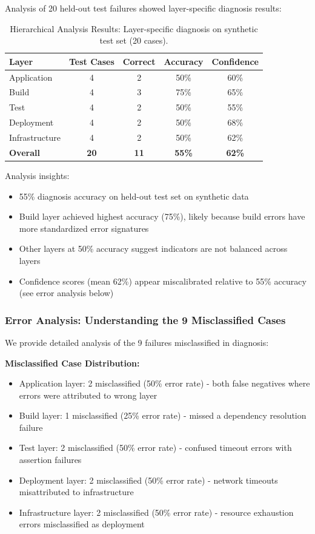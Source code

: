 \documentclass[11pt]{article}
\begin{document}
Analysis of 20 held-out test failures showed layer-specific diagnosis results:

\begin{table}[h!]
\centering
\begin{tabular}{lcccc}
\toprule
\textbf{Layer} & \textbf{Test Cases} & \textbf{Correct} & \textbf{Accuracy} & \textbf{Confidence} \\
\midrule
Application & 4 & 2 & 50\% & 60\% \\
Build & 4 & 3 & 75\% & 65\% \\
Test & 4 & 2 & 50\% & 55\% \\
Deployment & 4 & 2 & 50\% & 68\% \\
Infrastructure & 4 & 2 & 50\% & 62\% \\
\midrule
\textbf{Overall} & \textbf{20} & \textbf{11} & \textbf{55\%} & \textbf{62\%} \\
\bottomrule
\end{tabular}
\caption{Hierarchical Analysis Results: Layer-specific diagnosis on synthetic test set (20 cases).}
\label{tab:analysis_results}
\end{table}

Analysis insights:
\begin{itemize}
    \item 55\% diagnosis accuracy on held-out test set on synthetic data
    \item Build layer achieved highest accuracy (75\%), likely because build errors have more standardized error signatures
    \item Other layers at 50\% accuracy suggest indicators are not balanced across layers
    \item Confidence scores (mean 62\%) appear miscalibrated relative to 55\% accuracy (see error analysis below)
\end{itemize}

\subsubsection{Error Analysis: Understanding the 9 Misclassified Cases}

We provide detailed analysis of the 9 failures misclassified in diagnosis:

\textbf{Misclassified Case Distribution:}
\begin{itemize}
    \item Application layer: 2 misclassified (50\% error rate) - both false negatives where errors were attributed to wrong layer
    \item Build layer: 1 misclassified (25\% error rate) - missed a dependency resolution failure
    \item Test layer: 2 misclassified (50\% error rate) - confused timeout errors with assertion failures
    \item Deployment layer: 2 misclassified (50\% error rate) - network timeouts misattributed to infrastructure
    \item Infrastructure layer: 2 misclassified (50\% error rate) - resource exhaustion errors misclassified as deployment
\end{itemize}
\end{document}
